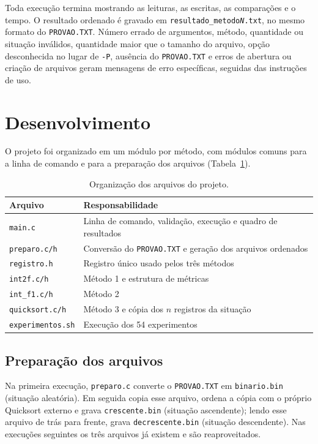 \documentclass{article}
\begin{document}
Toda execução termina mostrando as leituras, as escritas, as comparações e o tempo. O resultado ordenado é gravado em \texttt{resultado\_metodo\textit{N}.txt}, no mesmo formato do \texttt{PROVAO.TXT}. Número errado de argumentos, método, quantidade ou situação inválidos, quantidade maior que o tamanho do arquivo, opção desconhecida no lugar de \texttt{-P}, ausência do \texttt{PROVAO.TXT} e erros de abertura ou criação de arquivos geram mensagens de erro específicas, seguidas das instruções de uso.

\clearpage
\section{Desenvolvimento}

O projeto foi organizado em um módulo por método, com módulos comuns para a linha de comando e para a preparação dos arquivos (Tabela~\ref{tab:arquivos}).

\begin{table}[!htb]
    \centering
    \begin{tabular}{|l|l|}
        \hline\hline
        Arquivo & Responsabilidade \\\hline
        \texttt{main.c} & Linha de comando, validação, execução e quadro de resultados \\
        \texttt{preparo.c/h} & Conversão do \texttt{PROVAO.TXT} e geração dos arquivos ordenados \\
        \texttt{registro.h} & Registro único usado pelos três métodos \\
        \texttt{int2f.c/h} & Método 1 e estrutura de métricas \\
        \texttt{int\_f1.c/h} & Método 2 \\
        \texttt{quicksort.c/h} & Método 3 e cópia dos $n$ registros da situação \\
        \texttt{experimentos.sh} & Execução dos 54 experimentos \\\hline\hline
    \end{tabular}
    \caption{\label{tab:arquivos}Organização dos arquivos do projeto.}
\end{table}

\subsection{Preparação dos arquivos}

Na primeira execução, \texttt{preparo.c} converte o \texttt{PROVAO.TXT} em \texttt{binario.bin} (situação aleatória). Em seguida copia esse arquivo, ordena a cópia com o próprio Quicksort externo e grava \texttt{crescente.bin} (situação ascendente); lendo esse arquivo de trás para frente, grava \texttt{decrescente.bin} (situação descendente). Nas execuções seguintes os três arquivos já existem e são reaproveitados.
\end{document}
